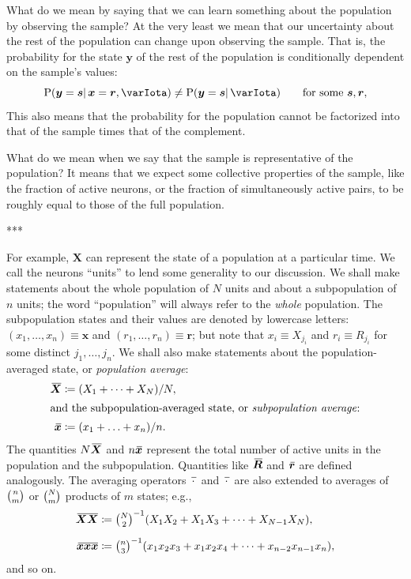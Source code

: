 \documentclass{article}
\theoremstyle{remark}
\theoremstyle{innote}
\newcommand*{\defd}{\coloneqq}
\renewcommand*{\|}{\mathpunct{|}}%
\newcommand*{\dotv}{\mathord{\,\cdot\,}}%
\newcommand*{\p}{\mathrm{P}}%
\newcommand*{\eg}{{e.g.}}
\theoremstyle{simple}
\newcommand*{\widebar}[1]{{\mkern1.5mu\skew{2}\overline{\mkern-1.5mu#1\mkern-1.5mu}\mkern 1.5mu}}
\newcommand*{\av}{\widebar} %
\newcommand*{\sav}{\widebar} %
\newcommand*{\yxx}{x}%
\newcommand*{\yx}{\bm{\yxx}}%
\newcommand*{\yxs}{\sav{\yx}}%
\newcommand*{\yX}{\bm{X}}%
\newcommand*{\yy}{\bm{y}}%
\newcommand*{\yXf}{\av{\yX}}%
\newcommand*{\yr}{\bm{r}}%
\newcommand*{\ys}{\bm{s}}%
\newcommand*{\yrs}{\sav{\yr}}%
\newcommand*{\yR}{\bm{R}}%
\newcommand*{\yRf}{\av{\yR}}%
\newcommand*{\yH}{\varIota}
\begin{document}
What do we mean by saying that we can learn something about the population
by observing the sample? At the very least we mean that our uncertainty
about the rest of the population can change upon observing the sample. That
is, the probability for the state $\yy$ of the rest of the population is
conditionally dependent on the sample's values:
\begin{equation}
  \label{eq:conditionally_dependent_sample}
  \p(\yy =\ys \| \yx=\yr,\yH) \ne \p(\yy =\ys \|\yH)
  \qquad\text{for some $\ys,\yr$},
\end{equation}
This also means that the probability for the population cannot be
factorized into that of the sample times that of the complement.

What do we mean when we say that the sample is representative of the
population? It means that we expect some collective properties of the
sample, like the fraction of active neurons, or the fraction of
simultaneously active pairs, to be roughly equal to those of the full
population.

***

For example, $\yX$ can
represent the state of a population at a particular time. We call the
neurons \enquote{units} to lend some generality to our discussion. We shall
make statements about the whole population of $N$ units and about a
subpopulation of $n$ units; the word \enquote{population} will always refer
to the \emph{whole} population. The subpopulation states and their values
are denoted by lowercase letters: $(x_1, \dotsc, x_n)\equiv\yx$ and
$(r_1, \dotsc, r_n)\equiv\yr$; but note that $x_i \equiv X_{j_i}$ and
$r_i \equiv R_{j_i}$ for some distinct $j_1,\dotsc,j_n$. We shall also make
statements about the population-averaged state, or \emph{population
  average}:
\begin{align}
  \label{noeq:population-av}
   \yXf &\defd (X_1 + \dotsb + X_N)/N,
\\
\intertext{and the subpopulation-averaged state, or \emph{subpopulation average}:}
\label{noeq:subpopulation-av}
\yxs &\defd (x_1 + \dotsc + x_n)/n.
\end{align}
The quantities $N\yXf$ and $n\yxs$ represent the total number of active
units in the population and the subpopulation. Quantities like $\yRf$ and $\yrs$
are defined analogously. The averaging operators $\sav{\dotv}$ and
$\av{\dotv}$ are also extended to averages of $\tbinom{n}{m}$ or
$\tbinom{N}{m}$ products of $m$ states; \eg,
\begin{align}
\av{\yX \yX} &\defd
\tbinom{N}{2}^{-1} (X_1 X_2 + X_1 X_3  + \dotsb +  X_{N-1} X_N),
\\[2\jot]
\sav{\yx\yx\yx} &\defd
\tbinom{n}{3}^{-1} (x_1 x_2 x_3 + x_1 x_2 x_4 + \dotsb + x_{n-2} x_{n-1} x_n),
\end{align}
and so on.
\end{document}
